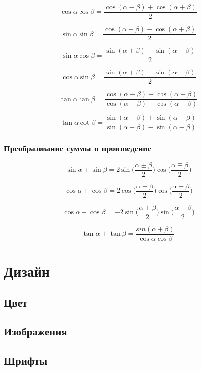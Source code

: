 \documentclass[
  letterpaper,
  DIV=11,
  numbers=noendperiod]{scrreprt}
\theoremstyle{definition}
\theoremstyle{remark}
\begin{document}
\[
\cos \alpha \cos \beta = \frac{\cos (\alpha - \beta) + \cos (\alpha + \beta)}{2}
\]

\[
\sin \alpha \sin \beta = \frac{\cos (\alpha - \beta) - \cos (\alpha + \beta)}{2}
\]

\[
\sin \alpha \cos \beta = \frac{\sin (\alpha + \beta) + \sin (\alpha - \beta)}{2}
\]

\[
\cos \alpha \sin \beta = \frac{\sin (\alpha + \beta) - \sin (\alpha - \beta)}{2}
\]

\[
\tan \alpha \tan \beta = \frac{\cos (\alpha - \beta) - \cos (\alpha + \beta)}{\cos (\alpha - \beta) + \cos (\alpha + \beta)}
\]

\[
\tan \alpha \cot \beta = \frac{\sin (\alpha + \beta) + \sin (\alpha - \beta)}{\sin (\alpha + \beta) - \sin (\alpha - \beta)}
\]

\subsection{Преобразование суммы в произведение}\label{trig_sum_to_prod}

\[
\sin \alpha \pm \sin \beta = 2 \sin \Big(\frac{\alpha \pm \beta}{2}\Big) \cos \Big(\frac{\alpha \mp \beta}{2}\Big)
\]

\[
\cos \alpha + \cos \beta = 2 \cos \Big(\frac{\alpha + \beta}{2}\Big) \cos \Big(\frac{\alpha - \beta}{2}\Big)
\]

\[
\cos \alpha - \cos \beta = -2 \sin \Big(\frac{\alpha + \beta}{2}\Big) \sin \Big(\frac{\alpha - \beta}{2}\Big)
\]

\[
\tan \alpha \pm \tan \beta = \frac{sin(\alpha + \beta)}{\cos \alpha \cos \beta}
\]


\chapter{Дизайн}\label{ux434ux438ux437ux430ux439ux43d}

\section{Цвет}\label{ux446ux432ux435ux442}

\section{Изображения}\label{ux438ux437ux43eux431ux440ux430ux436ux435ux43dux438ux44f}

\section{Шрифты}\label{ux448ux440ux438ux444ux442ux44b}
\end{document}
